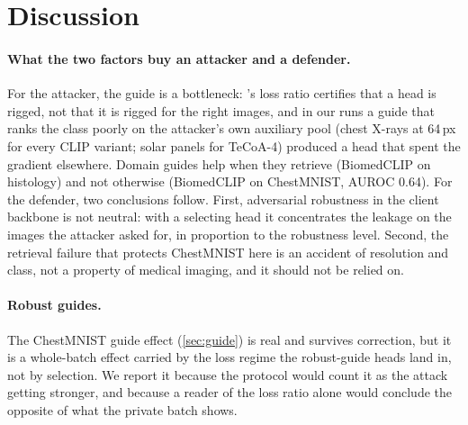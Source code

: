 \section{Discussion}
\label{sec:discussion}

\paragraph{What the two factors buy an attacker and a defender.}
For the attacker, the guide is a bottleneck: \geminio's loss ratio certifies that a head is rigged, not that it is rigged for the right images, and in our runs a guide that ranks the class poorly on the attacker's own auxiliary pool (chest X-rays at 64\,px for every CLIP variant; solar panels for TeCoA-4) produced a head that spent the gradient elsewhere.
Domain guides help when they retrieve (BiomedCLIP on histology) and not otherwise (BiomedCLIP on ChestMNIST, AUROC 0.64).
For the defender, two conclusions follow. First, adversarial robustness in the client backbone is not neutral: with a selecting head it concentrates the leakage on the images the attacker asked for, in proportion to the robustness level. Second, the retrieval failure that protects ChestMNIST here is an accident of resolution and class, not a property of medical imaging, and it should not be relied on.

\paragraph{Robust guides.}
The ChestMNIST guide effect (\cref{sec:guide}) is real and survives correction, but it is a whole-batch effect carried by the loss regime the robust-guide heads land in, not by selection.
We report it because the \geminio protocol would count it as the attack getting stronger, and because a reader of the loss ratio alone would conclude the opposite of what the private batch shows.

